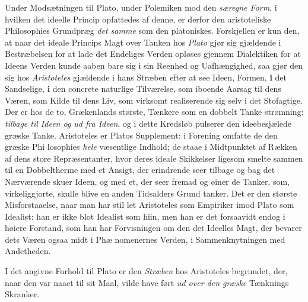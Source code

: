 Under Modsætningen til Plato, under Polemiken mod den
\emph{særegne Form}, i hvilken det ideelle Princip opfattedes af
denne, er derfor den aristoteliske Philosophies Grundpræg \emph{det
samme} som den platoniskes. Forskjellen er kun den, at naar
det ideale Princips Magt over Tanken hos \emph{Plato} gjør sig
gjældende i Bestræbelsen for at lade det Endeliges Verden
opløses gjennem Dialektiken for at Ideens Verden kunde aaben\-%
bare sig i sin Reenhed og Uafhængighed, saa gjør den sig
hos \emph{Aristoteles} gjældende i hans Stræben efter at see Ideen,
Formen, \textbf{i} det Sandselige, \textbf{i} den concrete naturlige Tilværelse,
som iboende Aarsag til dens Væren, som Kilde til dens Liv,
som virksomt realiserende sig selv i det Stofagtige. Der er
hos de to, Grækenlands største, Tænkere som en dobbelt Tanke\-%
strømning: \emph{tilbage til Ideen og ud fra Ideen}, og i dette
Kredsløb pulserer den ideebesjælede græske Tanke. Aristoteles
er Platos Supplement: i Forening omfatte de den græske Phi\-%
\setcounter{footnote}{0}%
losophies \emph{hele} væsentlige Indhold; de staae i Midtpunktet af
Rækken af dens store Repræsentanter, hvor deres ideale
Skikkelser ligesom smelte sammen til en Dobbeltherme med et
Ansigt, der erindrende seer tilbage og bag det Nærværende
skuer Ideen, og med et, der seer fremad og øiner de Tanker,
som, virkeliggjorte, skulle blive en anden Tidsalders Grund\-%
tanker. Det er den største Misforstaaelse, naar man har stil\-%
let Aristoteles som Empiriker imod Plato som Idealist: han
er ikke blot Idealist som hiin, men han er det forsaavidt
endog i høiere Forstand, som han har Forvisningen om den
det Ideelles Magt, der bevarer dets Væren ogsaa midt i Phæ\-%
nomenernes Verden, i Sammenknytningen med Andetheden.

I det angivne Forhold til Plato er den \emph{Stræben} hos
Aristoteles begrundet, der, naar den var naaet til sit Maal,
vilde have ført \emph{ud over den græske} Tænknings Skranker.

